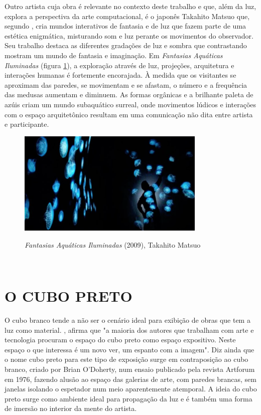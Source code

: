Outro artista cuja obra é relevante no contexto deste trabalho e que, além da luz, explora a perspectiva da arte computacional, é o japonês Takahito Matsuo que, segundo , cria mundos interativos de fantasia e de luz que fazem parte de uma estética enigmática, misturando som e luz perante os movimentos do observador. Seu trabalho destaca as diferentes gradações de luz e sombra que contrastando mostram um mundo de fantasia e imaginação. Em \textit{Fantasias Aquáticas Iluminadas} (figura \ref{fig:takahito_matsuo}), a exploração através de luz, projeções, arquitetura e interações humanas é fortemente encorajada. À medida que os visitantes se aproximam das paredes, se movimentam e se afastam, o número e a frequência das medusas aumentam e diminuem. As formas orgânicas e a brilhante paleta de azúis criam um mundo subaquático surreal, onde movimentos lúdicos e interações com o espaço arquitetônico resultam em uma comunicação não dita entre artista e participante. 

\begin{figure}[H]
    \centering
    \caption{\textit{Fantasias Aquáticas Iluminadas} (2009), Takahito Matsuo}
	\vspace*{0,2cm}
    \includegraphics[width=0.8\textwidth]{./04-figuras/takahito_matsuo}
    \label{fig:takahito_matsuo}
\end{figure}
\vspace*{-0,9cm}
{\raggedright {}}\\


\section{O CUBO PRETO}

O cubo branco tende a não ser o cenário ideal para exibição de obras que tem a luz como material. , afirma que "a maioria dos autores que trabalham com arte e tecnologia procuram o espaço do cubo preto como espaço expositivo. Neste espaço o que interessa é um novo ver, um espanto com a imagem". Diz ainda que o nome cubo preto para este tipo de exposição surge em contraposição ao cubo branco, criado por Brian O'Doherty, num ensaio publicado pela revista Artforum em 1976, fazendo alusão ao espaço das galerias de arte, com paredes brancas, sem janelas isolando o espetador num meio aparentemente atemporal. A ideia do cubo preto surge como ambiente ideal para propagação da luz e é também uma forma de imersão no interior da mente do artista.

